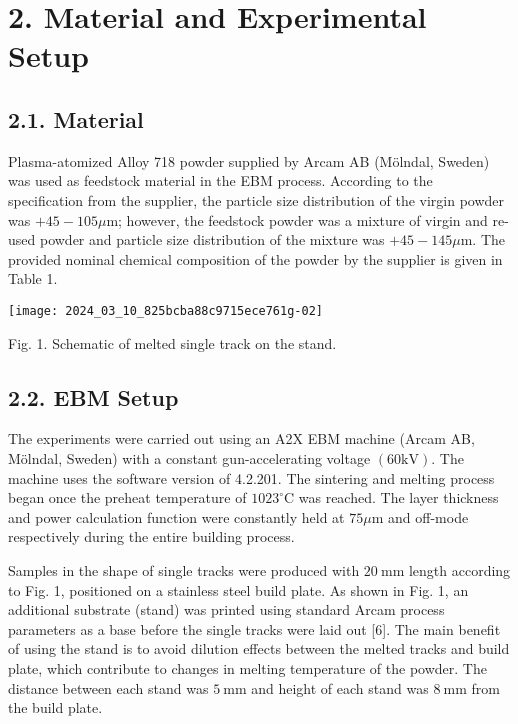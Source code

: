 \documentclass[10pt]{article}
\begin{document}
\section*{2. Material and Experimental Setup}
\subsection*{2.1. Material}
Plasma-atomized Alloy 718 powder supplied by Arcam AB (Mölndal, Sweden) was used as feedstock material in the EBM process. According to the specification from the supplier, the particle size distribution of the virgin powder was $+45-105 \mu \mathrm{m}$; however, the feedstock powder was a mixture of virgin and re-used powder and particle size distribution of the mixture was $+45-145 \mu \mathrm{m}$. The provided nominal chemical composition of the powder by the supplier is given in Table 1.

\begin{center}
\texttt{[image: 2024\_03\_10\_825bcba88c9715ece761g-02]}
\end{center}

Fig. 1. Schematic of melted single track on the stand.

\subsection*{2.2. EBM Setup}
The experiments were carried out using an A2X EBM machine (Arcam AB, Mölndal, Sweden) with a constant gun-accelerating voltage $(60 \mathrm{kV})$. The machine uses the software version of 4.2.201. The sintering and melting process began once the preheat temperature of $1023^{\circ} \mathrm{C}$ was reached. The layer thickness and power calculation function were constantly held at $75 \mu \mathrm{m}$ and off-mode respectively during the entire building process.

Samples in the shape of single tracks were produced with $20 \mathrm{~mm}$ length according to Fig. 1, positioned on a stainless steel build plate. As shown in Fig. 1, an additional substrate (stand) was printed using standard Arcam process parameters as a base before the single tracks were laid out [6]. The main benefit of using the stand is to avoid dilution effects between the melted tracks and build plate, which contribute to changes in melting temperature of the powder. The distance between each stand was $5 \mathrm{~mm}$ and height of each stand was $8 \mathrm{~mm}$ from the build plate.
\end{document}
